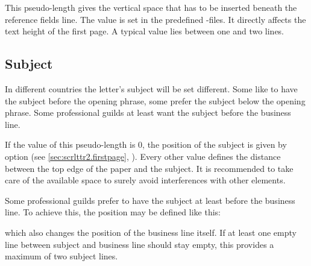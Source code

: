 \begin{Declaration}
\end{Declaration}
%
This pseudo-length gives the vertical space that has to be inserted beneath
the reference fields line. The value is set in the predefined
-files. It
directly affects the text height of the first page. A typical value lies
between one and two lines.%
%
%
%
%

\subsection{Subject}
\label{sec:scrlttr2-experts.subject}%

In different countries the letter's subject will be set different. Some like
to have the subject before the opening phrase, some prefer the subject below
the opening phrase. Some professional guilds at least want the subject before
the business line.

\begin{Declaration}
\end{Declaration}
%
%
If the value of this pseudo-length is 0, the
position of the subject is given by option
%
 (see
\autoref{sec:scrlttr2.firstpage}, ).
Every other value defines the distance between the top edge of the paper and
the subject. It is recommended to take care of the available
space to surely avoid interferences with other elements.
\begin{Example}
  Some professional guilds prefer to have the subject at least before the
  business line. To achieve this, the position may be defined like this:
  which also changes the position of the business line itself. If at least one
  empty line between subject and business line should stay empty, this
  provides a maximum of two subject lines.
\end{Example}
%


